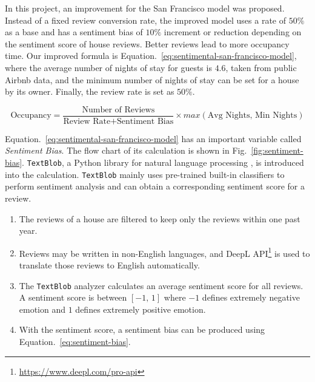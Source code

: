\documentclass[conference, compsoc]{IEEEtran}
\begin{document}
In this project, an improvement for the San Francisco model was proposed.
Instead of a fixed review conversion rate, the improved model uses a rate of $50\%$ as a base and has a sentiment bias of $10\%$ increment or reduction depending on the sentiment score of house reviews.
Better reviews lead to more occupancy time.
Our improved formula is Equation.~\ref{eq:sentimental-san-francisco-model},
where the average number of nights of stay for guests is $4.6$, taken from public Airbnb data,
and the minimum number of nights of stay can be set for a house by its owner.
Finally, the review rate is set as $50\%$.

\begin{strip}
    \begin{equation}
        \text{Occupancy} = \frac{\text{Number of Reviews}}{\text{Review Rate} + \text{Sentiment Bias}} \times max(\text{Avg Nights},\, \text{Min Nights})
        \label{eq:sentimental-san-francisco-model}
    \end{equation}
\end{strip}

Equation.~\ref{eq:sentimental-san-francisco-model} has an important variable called \emph{Sentiment Bias}.
The flow chart of its calculation is shown in Fig.~\ref{fig:sentiment-bias}.
\verb|TextBlob|, a Python library for natural language processing \cite{textblob}, is introduced into the calculation.
\verb|TextBlob| mainly uses pre-trained built-in classifiers to perform sentiment analysis and can obtain a corresponding sentiment score for a review.

\begin{enumerate}
    \item
    The reviews of a house are filtered to keep only the reviews within one past year.

    \item
    Reviews may be written in non-English languages, and DeepL API\footnote{\url{https://www.deepl.com/pro-api}} is used to translate those reviews to English automatically.

    \item
    The \verb|TextBlob| analyzer calculates an average sentiment score for all reviews.
    A sentiment score is between $[-1,\, 1]$ where $-1$ defines extremely negative emotion and $1$ defines extremely positive emotion.

    \item
    With the sentiment score, a sentiment bias can be produced using Equation.~\ref{eq:sentiment-bias}.
\end{enumerate}
\end{document}
